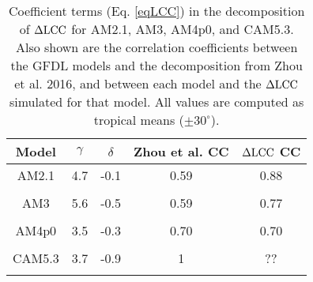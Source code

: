 \documentclass[grl]{agutex2015}
\begin{document}
\begin{table}
    \caption{Coefficient terms (Eq. \ref{eqLCC}) in the decomposition of $\Delta \rm{LCC}$ for AM2.1, AM3, AM4p0, and CAM5.3.  Also shown are the correlation coefficients between the GFDL models and the decomposition from Zhou et al. 2016, and between each model and the $\Delta \rm{LCC}$ simulated for that model.  All values are computed as tropical means ($\pm 30^{\circ}$).}
    \begin{center}
    \begin{tabular}{*{5}{c}}
    \hline
    \hline
    Model      & $\gamma$                                      & $\delta$    &     Zhou et al.  CC       & $\Delta \rm{LCC}$ CC         \\ \hline
    AM2.1           &   4.7  &    -0.1            &  0.59    & 0.88                                          \\
    \\
    AM3                & 5.6   &  -0.5           &   0.59   & 0.77                                          \\ 
    \\
    AM4p0              & 3.5 &  -0.3          & 0.70    &   0.70                                                     \\ 
    \\
    CAM5.3               & 3.7 &  -0.9     & 1       &    ??                                                     \\ 
    \\
     \end{tabular}\par
     \label{LCCtable}
\end{center}
\end{table}
\end{document}
